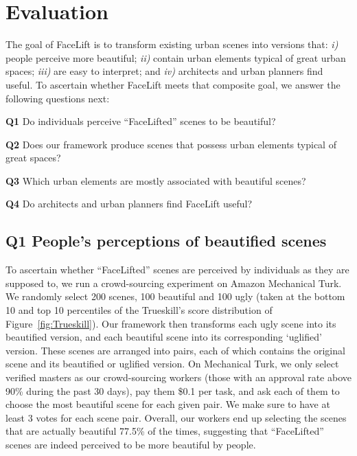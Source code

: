 \section{Evaluation}
\label{sec:evaluation}

The goal of FaceLift is to transform existing urban scenes into versions that: \emph{i)} people perceive more beautiful; \emph{ii)} contain urban elements typical of great urban spaces; \emph{iii)} are easy to interpret; and \emph{iv)} architects and urban planners find useful. To ascertain whether FaceLift meets that composite goal, we answer the following questions next: 

\begin{description}
\item{\textbf{Q1}} Do individuals perceive ``FaceLifted'' scenes to be beautiful?

\item{\textbf{Q2}}  Does our framework produce scenes that possess urban elements typical of great spaces?

\item{\textbf{Q3}}  Which urban elements are mostly associated with beautiful scenes?

\item{\textbf{Q4}}  Do architects and urban planners find FaceLift useful?

\end{description}


\subsection*{Q1 People's perceptions of beautified scenes}
To ascertain whether ``FaceLifted'' scenes are perceived by individuals as they are supposed to, we run a crowd-sourcing experiment on Amazon Mechanical Turk.  We randomly select 200 scenes, 100 beautiful and 100 ugly  (taken at the bottom 10 and top 10 percentiles of the Trueskill's score distribution of Figure~\ref{fig:Trueskill}). Our framework then transforms each ugly scene into its beautified version, and each beautiful scene into its corresponding `uglified' version. These scenes are arranged into pairs, each of which contains the original scene and its beautified or uglified version. On  Mechanical Turk, we only select verified masters as our crowd-sourcing workers (those with an approval rate above 90\% during the past 30 days), pay them \$0.1 per  task,  and ask each of them to choose the most beautiful scene for each given pair.  We make sure to have at least 3 votes for each scene pair. Overall, our workers end up selecting the scenes that are actually beautiful 77.5\% of the times, suggesting that ``FaceLifted'' scenes are indeed perceived to be more beautiful by people. 

